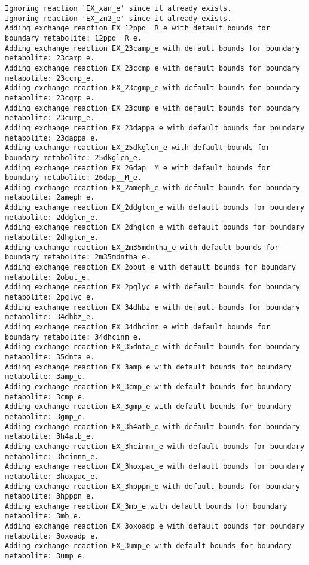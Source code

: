 \documentclass[
  letterpaper,
  DIV=11,
  numbers=noendperiod]{scrartcl}
\begin{document}
\begin{verbatim}
Ignoring reaction 'EX_xan_e' since it already exists.
Ignoring reaction 'EX_zn2_e' since it already exists.
Adding exchange reaction EX_12ppd__R_e with default bounds for boundary metabolite: 12ppd__R_e.
Adding exchange reaction EX_23camp_e with default bounds for boundary metabolite: 23camp_e.
Adding exchange reaction EX_23ccmp_e with default bounds for boundary metabolite: 23ccmp_e.
Adding exchange reaction EX_23cgmp_e with default bounds for boundary metabolite: 23cgmp_e.
Adding exchange reaction EX_23cump_e with default bounds for boundary metabolite: 23cump_e.
Adding exchange reaction EX_23dappa_e with default bounds for boundary metabolite: 23dappa_e.
Adding exchange reaction EX_25dkglcn_e with default bounds for boundary metabolite: 25dkglcn_e.
Adding exchange reaction EX_26dap__M_e with default bounds for boundary metabolite: 26dap__M_e.
Adding exchange reaction EX_2ameph_e with default bounds for boundary metabolite: 2ameph_e.
Adding exchange reaction EX_2ddglcn_e with default bounds for boundary metabolite: 2ddglcn_e.
Adding exchange reaction EX_2dhglcn_e with default bounds for boundary metabolite: 2dhglcn_e.
Adding exchange reaction EX_2m35mdntha_e with default bounds for boundary metabolite: 2m35mdntha_e.
Adding exchange reaction EX_2obut_e with default bounds for boundary metabolite: 2obut_e.
Adding exchange reaction EX_2pglyc_e with default bounds for boundary metabolite: 2pglyc_e.
Adding exchange reaction EX_34dhbz_e with default bounds for boundary metabolite: 34dhbz_e.
Adding exchange reaction EX_34dhcinm_e with default bounds for boundary metabolite: 34dhcinm_e.
Adding exchange reaction EX_35dnta_e with default bounds for boundary metabolite: 35dnta_e.
Adding exchange reaction EX_3amp_e with default bounds for boundary metabolite: 3amp_e.
Adding exchange reaction EX_3cmp_e with default bounds for boundary metabolite: 3cmp_e.
Adding exchange reaction EX_3gmp_e with default bounds for boundary metabolite: 3gmp_e.
Adding exchange reaction EX_3h4atb_e with default bounds for boundary metabolite: 3h4atb_e.
Adding exchange reaction EX_3hcinnm_e with default bounds for boundary metabolite: 3hcinnm_e.
Adding exchange reaction EX_3hoxpac_e with default bounds for boundary metabolite: 3hoxpac_e.
Adding exchange reaction EX_3hpppn_e with default bounds for boundary metabolite: 3hpppn_e.
Adding exchange reaction EX_3mb_e with default bounds for boundary metabolite: 3mb_e.
Adding exchange reaction EX_3oxoadp_e with default bounds for boundary metabolite: 3oxoadp_e.
Adding exchange reaction EX_3ump_e with default bounds for boundary metabolite: 3ump_e.

\end{verbatim}
\end{document}
